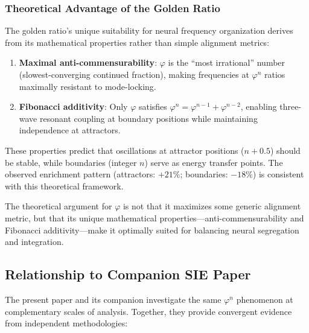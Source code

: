 \documentclass[11pt,a4paper]{article}
\newcommand{\phisym}{\varphi}
\begin{document}
\subsubsection{Theoretical Advantage of the Golden Ratio}

The golden ratio's unique suitability for neural frequency organization derives from its mathematical properties rather than simple alignment metrics:

\begin{enumerate}
    \item \textbf{Maximal anti-commensurability}: $\phisym$ is the ``most irrational'' number (slowest-converging continued fraction), making frequencies at $\phisym^n$ ratios maximally resistant to mode-locking.

    \item \textbf{Fibonacci additivity}: Only $\phisym$ satisfies $\phisym^n = \phisym^{n-1} + \phisym^{n-2}$, enabling three-wave resonant coupling at boundary positions while maintaining independence at attractors.
\end{enumerate}

These properties predict that oscillations at attractor positions ($n + 0.5$) should be stable, while boundaries (integer $n$) serve as energy transfer points. The observed enrichment pattern (attractors: $+21\%$; boundaries: $-18\%$) is consistent with this theoretical framework.

\begin{keyinsight}
The theoretical argument for $\phisym$ is not that it maximizes some generic alignment metric, but that its unique mathematical properties---anti-commensurability and Fibonacci additivity---make it optimally suited for balancing neural segregation and integration.
\end{keyinsight}

\subsection{Relationship to Companion SIE Paper}

The present paper and its companion \citep{lacy_sie} investigate the same $\phisym^n$ phenomenon at complementary scales of analysis. Together, they provide convergent evidence from independent methodologies:
\end{document}
